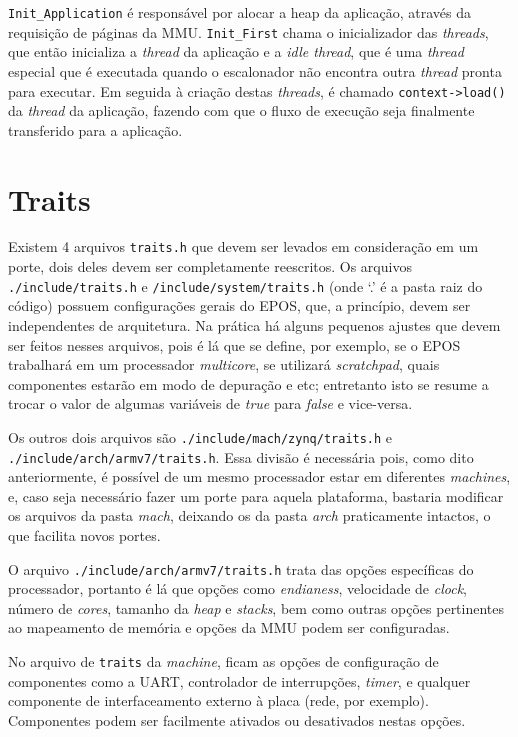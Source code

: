 \verb+Init_Application+ é responsável por alocar a heap da aplicação, através da requisição de páginas da MMU. \verb+Init_First+ chama o inicializador das \emph{threads}, que então inicializa a \emph{thread} da aplicação e a \emph{idle thread}, que é uma \emph{thread} especial que é executada quando o escalonador não encontra outra \emph{thread} pronta para executar. Em seguida à criação destas \emph{threads}, é chamado \verb+context->load()+ da \emph{thread} da aplicação, fazendo com que o fluxo de execução seja finalmente transferido para a aplicação.

\section{Traits}
\label{sec:traits}
Existem 4 arquivos \verb=traits.h= que devem ser levados em consideração em um porte, dois deles devem ser completamente reescritos. Os arquivos \verb+./include/traits.h+ e \verb+/include/system/traits.h+ (onde `.' é a pasta raiz do código) possuem configurações gerais do EPOS, que, a princípio, devem ser independentes de arquitetura. Na prática há alguns pequenos ajustes que devem ser feitos nesses arquivos, pois é lá que se define, por exemplo, se o EPOS trabalhará em um processador \emph{multicore}, se utilizará \emph{scratchpad}, quais componentes estarão em modo de depuração e etc; entretanto isto se resume a trocar o valor de algumas variáveis de \emph{true} para \emph{false} e vice-versa.

Os outros dois arquivos são \verb+./include/mach/zynq/traits.h+ e\\ \verb+./include/arch/armv7/traits.h+. Essa divisão é necessária pois, como dito anteriormente, é possível de um mesmo processador estar em diferentes \emph{machines}, e, caso seja necessário fazer um porte para aquela plataforma, bastaria modificar os arquivos da pasta \emph{mach}, deixando os da pasta \emph{arch} praticamente intactos, o que facilita novos portes.

O arquivo \verb+./include/arch/armv7/traits.h+ trata das opções específicas do processador, portanto é lá que opções como \emph{endianess}, velocidade de \emph{clock}, número de \emph{cores}, tamanho da \emph{heap} e \emph{stacks}, bem como outras opções pertinentes ao mapeamento de memória e opções da MMU podem ser configuradas.

No arquivo de \verb=traits= da \emph{machine}, ficam as opções de configuração de componentes como a UART, controlador de interrupções, \emph{timer}, e qualquer componente de interfaceamento externo à placa (rede, por exemplo). Componentes podem ser facilmente ativados ou desativados nestas opções.

